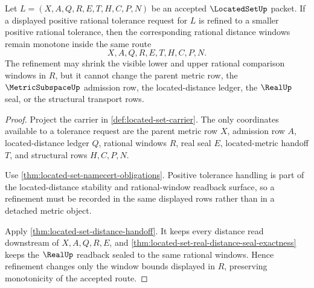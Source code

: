 \begin{theorem}
\label{thm:located-set-distance-window-monotonicity}
Let $L=(X,A,Q,R,E,T,H,C,P,N)$ be an accepted $\LocatedSetUp$ packet. If a displayed positive rational tolerance request for $L$ is refined to a smaller positive rational tolerance, then the corresponding rational distance windows remain monotone inside the same route
$$
X,A,Q,R,E,T,H,C,P,N .
$$
The refinement may shrink the visible lower and upper rational comparison windows in $R$, but it cannot change the parent metric row, the $\MetricSubspaceUp$ admission row, the located-distance ledger, the $\RealUp$ seal, or the structural transport rows.
\end{theorem}
\begin{proof}
Project the carrier in \autoref{def:located-set-carrier}. The only coordinates available to a tolerance request are the parent metric row $X$, admission row $A$, located-distance ledger $Q$, rational windows $R$, real seal $E$, located-metric handoff $T$, and structural rows $H,C,P,N$.

Use \autoref{thm:located-set-namecert-obligations}. Positive tolerance handling is part of the located-distance stability and rational-window readback surface, so a refinement must be recorded in the same displayed rows rather than in a detached metric object.

Apply \autoref{thm:located-set-distance-handoff}. It keeps every distance read downstream of $X,A,Q,R,E$, and \autoref{thm:located-set-real-distance-seal-exactness} keeps the $\RealUp$ readback sealed to the same rational windows. Hence refinement changes only the window bounds displayed in $R$, preserving monotonicity of the accepted route.
\end{proof}

